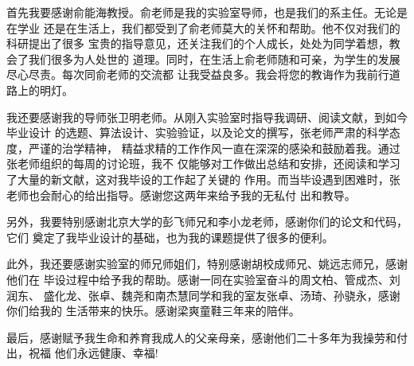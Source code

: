 ﻿
\begin{thankspage}
首先我要感谢俞能海教授。俞老师是我的实验室导师，也是我们的系主任。无论是在学业
还是在生活上，我们都受到了俞老师莫大的关怀和帮助。他不仅对我们的科研提出了很多
宝贵的指导意见，还关注我们的个人成长，处处为同学着想，教会了我们很多为人处世的
道理。同时，在生活上俞老师随和可亲，为学生的发展尽心尽责。每次同俞老师的交流都
让我受益良多。我会将您的教诲作为我前行道路上的明灯。
\par
我还要感谢我的导师张卫明老师。从刚入实验室时指导我调研、阅读文献，到如今毕业设计
的选题、算法设计、实验验证，以及论文的撰写，张老师严肃的科学态度，严谨的治学精神，
精益求精的工作作风一直在深深的感染和鼓励着我。通过张老师组织的每周的讨论班，我不
仅能够对工作做出总结和安排，还阅读和学习了大量的新文献，这对我毕设的工作起了关键的
作用。而当毕设遇到困难时，张老师也会耐心的给出指导。感谢您这两年来给予我的无私付
出和教导。
\par
另外，我要特别感谢北京大学的彭飞师兄和李小龙老师，感谢你们的论文和代码，它们
奠定了我毕业设计的基础，也为我的课题提供了很多的便利。
\par
此外，我还要感谢实验室的师兄师姐们，特别感谢胡校成师兄、姚远志师兄，感谢他们在
毕设过程中给予我的帮助。感谢一同在实验室奋斗的周文柏、管成杰、刘润东、
盛化龙、张卓、魏尧和南杰慧同学和我的室友张卓、汤琦、孙骁永，感谢你们给我的
生活带来的快乐。感谢梁爽童鞋三年来的陪伴。
\par
最后，感谢赋予我生命和养育我成人的父亲母亲，感谢他们二十多年为我操劳和付出，祝福
他们永远健康、幸福!
\end{thankspage}
